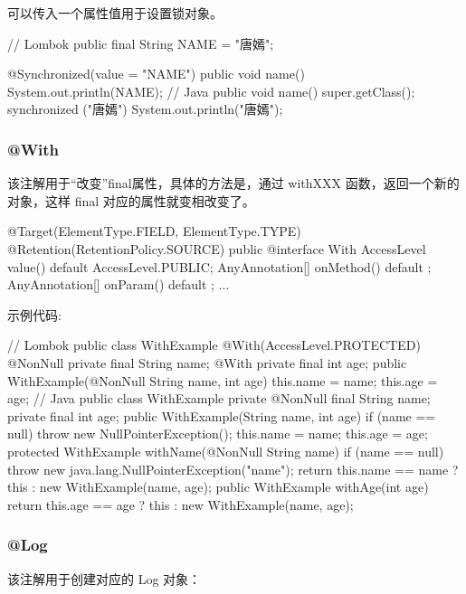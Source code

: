 可以传入一个属性值用于设置锁对象。

\begin{Java}
// Lombok
public final String NAME = "唐嫣";

@Synchronized(value = "NAME")
public void name() {
	System.out.println(NAME);
}
// Java
public void name() {
	super.getClass();
	synchronized ("唐嫣") {
		System.out.println("唐嫣");
	}
}
\end{Java}

\subsubsection{@With}

该注解用于“改变”final属性，具体的方法是，通过 withXXX 函数，返回一个新的对象，这样 final 对应的属性就变相改变了。

\begin{Java}
@Target({ElementType.FIELD, ElementType.TYPE})
@Retention(RetentionPolicy.SOURCE)
public @interface With {
    AccessLevel value() default AccessLevel.PUBLIC;
    AnyAnnotation[] onMethod() default {};
    AnyAnnotation[] onParam() default {};
    ...
}
\end{Java}

示例代码:

\begin{Java}
// Lombok
public class WithExample {
    @With(AccessLevel.PROTECTED) @NonNull private final String name;
    @With private final int age;
    public WithExample(@NonNull String name, int age) {
        this.name = name;
        this.age = age;
    }
}
// Java
public class WithExample {
    private @NonNull final String name;
    private final int age;
    public WithExample(String name, int age) {
        if (name == null) throw new NullPointerException();
        this.name = name;
        this.age = age;
    }
    protected WithExample withName(@NonNull String name) {
        if (name == null) throw new java.lang.NullPointerException("name");
        return this.name == name ? this : new WithExample(name, age);
    }
    public WithExample withAge(int age) {
        return this.age == age ? this : new WithExample(name, age);
    }
}
\end{Java}

\subsubsection{@Log}

该注解用于创建对应的 Log 对象：

